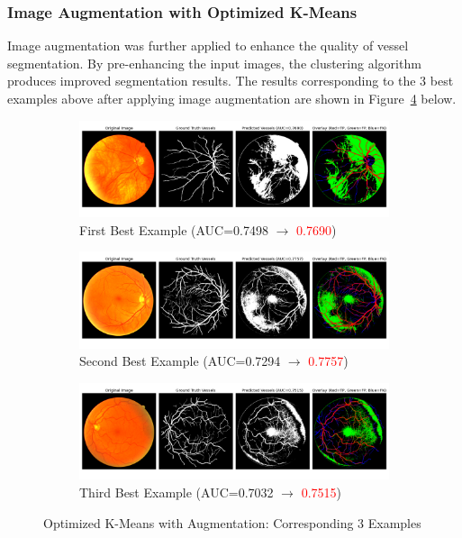 \documentclass[12pt,letterpaper]{article}
\begin{document}
\subsubsection{Image Augmentation with Optimized K-Means}
Image augmentation was further applied to enhance the quality of vessel segmentation. By pre-enhancing the input images, the clustering algorithm produces improved segmentation results. The results corresponding to the 3 best examples above after applying image augmentation are shown in Figure~\ref{fig:opt_aug} below. 
\begin{figure}[H]
    \centering
    \begin{subfigure}[H]{\textwidth}
        \centering
        \includegraphics[scale=0.35]{Figures/4 Optimized 1st.png}
        \vspace{-0.5cm}
        \caption{First Best Example (AUC=0.7498 $\rightarrow$ \textcolor{red}{0.7690})}
        \label{fig:opt_aug1}
    \end{subfigure}
    \begin{subfigure}[H]{\textwidth}
        \centering
        \includegraphics[scale=0.35]{Figures/4 Optimized 2nd.png}
        \vspace{-0.5cm}
        \caption{Second Best Example (AUC=0.7294 $\rightarrow$ \textcolor{red}{0.7757})}
        \label{fig:opt_aug2}
    \end{subfigure}
    \begin{subfigure}[H]{\textwidth}
        \centering
        \includegraphics[scale=0.35]{Figures/4 Optimized 3rd.png}
        \vspace{-0.5cm}
        \caption{Third Best Example (AUC=0.7032 $\rightarrow$ \textcolor{red}{0.7515})}
        \label{fig:opt_aug3}
    \end{subfigure}
    \caption{Optimized K-Means with Augmentation: Corresponding 3 Examples}
    \label{fig:opt_aug}
\end{figure}
\end{document}
